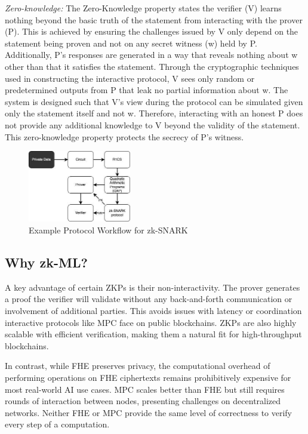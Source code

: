 \documentclass[conference]{IEEEtran}
\begin{document}
\textit{Zero-knowledge:} The Zero-Knowledge property states the verifier (V) learns nothing beyond the basic truth of the statement from interacting with the prover (P). This is achieved by ensuring the challenges issued by V only depend on the statement being proven and not on any secret witness (w) held by P. Additionally, P's responses are generated in a way that reveals nothing about w other than that it satisfies the statement. Through the cryptographic techniques used in constructing the interactive protocol, V sees only random or predetermined outputs from P that leak no partial information about w. The system is designed such that V's view during the protocol can be simulated given only the statement itself and not w. Therefore, interacting with an honest P does not provide any additional knowledge to V beyond the validity of the statement. This zero-knowledge property protects the secrecy of P's witness.
\begin{figure}[!ht]
    \centering
    \includegraphics[width=0.4\textwidth]{figures/zk-snark-overview.jpg}
    \caption{Example Protocol Workflow for zk-SNARK}
    \label{fig:Fig 1}
\end{figure}

\subsection{Why zk-ML?}

A key advantage of certain ZKPs is their non-interactivity. The prover generates a proof the verifier will validate without any back-and-forth communication or involvement of additional parties. This avoids issues with latency or coordination interactive protocols like MPC face on public blockchains. ZKPs are also highly scalable with efficient verification, making them a natural fit for high-throughput blockchains.

In contrast, while FHE preserves privacy, the computational overhead of performing operations on FHE ciphertexts remains prohibitively expensive for most real-world AI use cases. MPC scales better than FHE but still requires rounds of interaction between nodes, presenting challenges on decentralized networks. Neither FHE or MPC provide the same level of correctness to verify every step of a computation.
\end{document}
